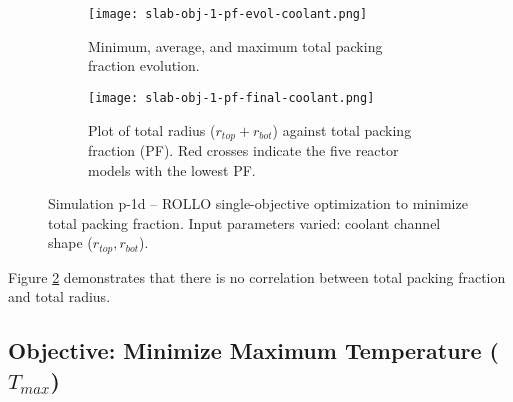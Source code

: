 \begin{figure}[htbp]
    \centering
    \begin{subfigure}{\textwidth}
        \texttt{[image: slab-obj-1-pf-evol-coolant.png]}
        \caption{Minimum, average, and maximum total packing fraction evolution.}
        \label{fig:slab-obj-1-pf-evol-coolant} 
    \end{subfigure}
    \begin{subfigure}{\textwidth}
        \texttt{[image: slab-obj-1-pf-final-coolant.png]}
        \caption{Plot of total radius ($r_{top} + r_{bot}$) against total packing 
        fraction (PF). Red crosses indicate the five reactor models with the 
        lowest PF.}
        \label{fig:slab-obj-1-pf-final-coolant} 
    \end{subfigure}
    \caption{Simulation p-1d -- ROLLO single-objective optimization to minimize total 
    packing fraction. Input parameters varied: coolant channel shape 
    ($r_{top}, r_{bot}$).}
    \label{fig:slab-obj-1-pf-coolant}
\end{figure}
Figure \ref{fig:slab-obj-1-pf-final-coolant} demonstrates that there is no correlation 
between total packing fraction and total radius. 

\subsection{Objective: Minimize Maximum Temperature ($T_{max}$)}

